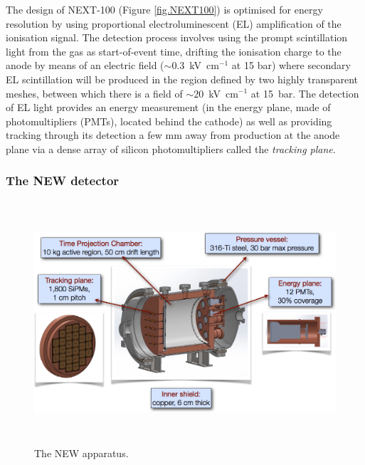 \documentclass[a4paper,11pt,oneside]{article}
\begin{document}
The design of NEXT-100 (Figure \ref{fig.NEXT100}) is optimised for energy resolution by using proportional electroluminescent (EL) amplification of the ionisation signal. The detection process involves using the prompt scintillation light from the gas as start-of-event time, drifting the ionisation charge to the anode by means of an electric field ($\sim0.3$~kV~cm$^{-1}$ at 15 bar) where secondary EL scintillation will be produced in the region defined by two highly transparent meshes, between which there is a field of $\sim20$~kV~cm$^{-1}$ at 15~bar. The detection of EL light provides an energy measurement (in the energy plane, made of photomultipliers (PMTs), located behind the cathode) as well as providing tracking through its detection a few mm away from production at the anode plane via a dense array of silicon photomultipliers called the \emph{tracking plane}.

\subsubsection*{The NEW detector}
\label{sec.new}
\begin{figure}
\centering
\includegraphics[height=9cm]{img/NEW.png}
\caption{The NEW apparatus.} \label{fig:NEW}
\end{figure}
\end{document}
